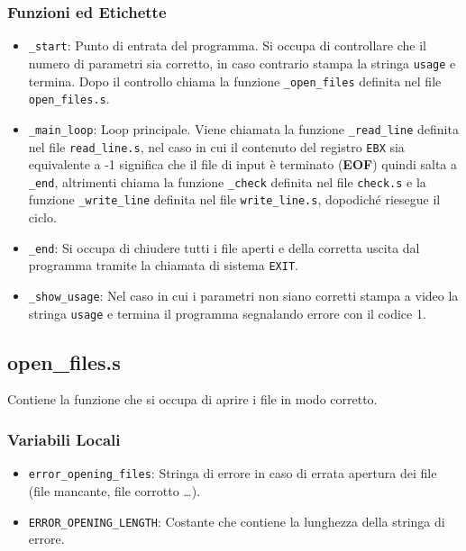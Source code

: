 \documentclass[a4paper,11pt]{article}
\begin{document}
		\subsubsection{Funzioni ed Etichette}
	\begin{itemize}
		\item \texttt{\_start}: Punto di entrata del programma. Si occupa di controllare che il numero di parametri sia corretto, in caso contrario stampa la stringa \texttt{usage} e termina. Dopo il controllo chiama la funzione \texttt{\_open\_files} definita nel file \texttt{open\_files.s}. 
		\item \texttt{\_main\_loop}: Loop principale. Viene chiamata la funzione \texttt{\_read\_line} definita nel file \texttt{read\_line.s}, nel caso in cui il contenuto del registro \texttt{EBX} sia equivalente a -1 significa che il file di input è terminato (\textbf{EOF}) quindi salta a \texttt{\_end}, altrimenti chiama la funzione \texttt{\_check} definita nel file \texttt{check.s} e la funzione \texttt{\_write\_line} definita nel file \texttt{write\_line.s}, dopodiché riesegue il ciclo.
		\item \texttt{\_end}: Si occupa di chiudere tutti i file aperti e della corretta uscita dal programma tramite la chiamata di sistema \texttt{EXIT}.
		\item \texttt{\_show\_usage}: Nel caso in cui i parametri non siano corretti stampa a video la stringa \texttt{usage} e termina il programma segnalando errore con il codice 1.
	\end{itemize}  
	
	\subsection{open\_files.s}
	Contiene la funzione che si occupa di aprire i file in modo corretto.
	\subsubsection{Variabili Locali} 
	\begin{itemize}
		\item \texttt{error\_opening\_files}: Stringa di errore in caso di errata apertura dei file (file mancante, file corrotto \ldots).
		\item \texttt{ERROR\_OPENING\_LENGTH}: Costante che contiene la lunghezza della stringa di errore.
	\end{itemize}
	
\end{document}
